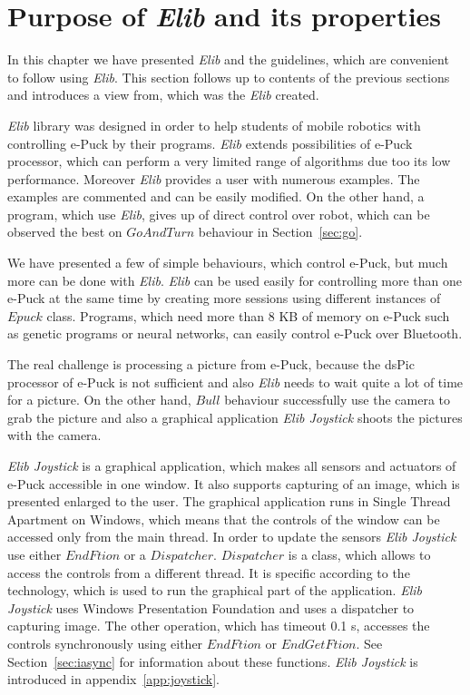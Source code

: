 \section{Purpose of {\it Elib} and its properties}
  In this chapter we have presented {\it Elib} and the guidelines, 
  which are convenient to follow using {\it Elib}. 
  This section follows up to contents of the previous sections and introduces a view from,
  which was the {\it Elib} created.

  {\it Elib} library was designed in order to help students of mobile robotics	
  with controlling e-Puck by their programs.
  {\it Elib} extends possibilities of e-Puck processor, 
  which can perform a very limited range of algorithms
  due too its low performance.
  Moreover {\it Elib} provides a user with numerous examples. The examples are commented
  and can be easily modified.
  On the other hand, a program, which use {\it Elib}, gives up of direct control over robot,
  which can be observed the best on $GoAndTurn$ behaviour in Section~\ref{sec:go}.

  We have presented a few of simple behaviours, which control e-Puck, 
  but much more can be done with {\it Elib}.
  {\it Elib} can be used easily for controlling more than one e-Puck at the same time
  by creating more sessions using
  different instances of $Epuck$ class. Programs, which need more than 8 KB of memory on e-Puck such 
  as genetic programs or neural networks, can easily control e-Puck over Bluetooth.

  The real challenge is processing a picture from e-Puck, 
  because the dsPic processor of e-Puck is not sufficient
  and also {\it Elib} needs to wait quite a lot of time for a picture.
  On the other hand, $Bull$ behaviour successfully use the camera to grab the picture
  and also a graphical application {\it Elib Joystick} shoots the pictures with the camera.

  {\it Elib Joystick} is a graphical application, which makes all sensors and actuators of e-Puck accessible in one window.
  It also supports capturing of an image, which is presented enlarged to the user.
  The graphical application runs in Single Thread Apartment on Windows, which means that the controls of the window can 
  be accessed only from the main thread.
  In order to update the sensors {\it Elib Joystick} use either $EndFtion$ or a $Dispatcher$.
  $Dispatcher$ is a class, which allows to access the controls from a different thread. 
  It is specific according to the technology,
  which is used to run the graphical part of the application. 
  {\it Elib Joystick} uses Windows Presentation Foundation and
  uses a dispatcher to capturing image. The other operation, 
  which has timeout 0.1 s, accesses the controls synchronously using
  either $EndFtion$ or $EndGetFtion$. See Section~\ref{sec:iasync} for information 
  about these functions. {\it Elib Joystick} is introduced in appendix~\ref{app:joystick}.

